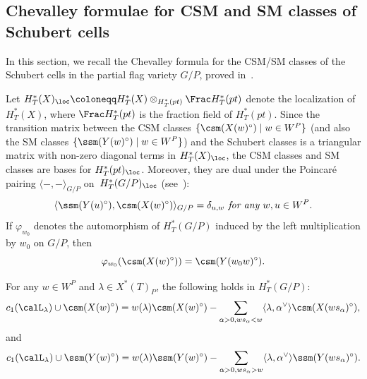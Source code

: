 \subsection{Chevalley formulae for CSM and SM classes of Schubert cells}
In this section, we recall the Chevalley formula for the CSM/SM classes of the Schubert cells in the partial flag variety $G/P$,
proved in~\cite{AMSS:shadows,su:quantum}.


Let $H^*_T(X)_{\loc}\coloneqq H^*_T(X)\otimes_{H^*_T(pt)} \Frac H^*_T(pt)$ denote the localization of $H^*_T(X)$, where 
$\Frac H^*_T(pt)$ is the fraction field of $H^*_T(pt)$. Since the transition matrix between the CSM classes $\{\csm(X(w)^\circ)\mid w\in W^P\}$ (and also the SM classes \mbox{$\{\ssm(Y(w)^\circ)\mid w\in W^P\}$}) and the Schubert classes is a triangular matrix with non-zero diagonal terms in $H^*_T(X)_{\loc}$, the CSM classes and SM classes are bases for $H_T^*(pt)_{\loc}$. Moreover, they are dual under the Poincar\'e pairing $\langle-,-\rangle_{G/P}$ on~$H_T^*(G/P)_{\loc}$ (see~\cite[Theorem 7.1]{AMSS:shadows}):
	\begin{equation*}
		\langle \ssm(Y(u)^\circ), \csm(X(w)^\circ)\rangle_{G/P}=\delta_{u,w} \textit{ for any } w,u\in W^P.
\end{equation*}
If $\varphi_{w_0}$ denotes the automorphism of $H_T^*(G/P)$ induced by the left multiplication by $w_0$ on $G/P$,
then
\begin{equation}\label{equ:w0action}
	\varphi_{w_0}(\csm(X(w)^\circ))=\csm(Y(w_0w)^\circ) \/.
\end{equation}
\begin{theorem}\label{thm:chevalley} 
	For any $w\in W^P$ and $\lambda\in X^*(T)_P$, the following holds in $H_T^*(G/P)$:
	\begin{equation*}\label{equ:ChePX}
		c_1(\calL_\lambda)\cup \csm (X(w)^\circ)=w(\lambda) \csm (X(w)^\circ)-\sum_{\alpha>0,ws_\alpha <w}\langle\lambda,\alpha^\vee\rangle \csm (X(ws_\alpha)^\circ),
	\end{equation*}
	and
	\begin{equation*}\label{equ:cheL}
		c_1(\calL_\lambda)\cup \ssm (Y(w)^\circ)=
		w(\lambda) \ssm (Y(w)^\circ)-\sum_{\alpha>0,ws_\alpha >w}\langle\lambda,\alpha^\vee\rangle {\ssm (Y(ws_\alpha)^\circ)} \/.
	\end{equation*}
\end{theorem}
